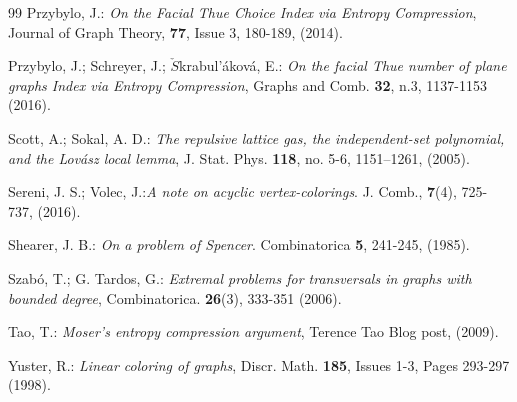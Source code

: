 \documentclass[11pt]{article}
\begin{document}
\begin{thebibliography}{99}
 Przybylo, J.: {\it On the Facial Thue Choice Index via Entropy Compression},
Journal of Graph Theory, {\bf 77}, Issue 3, 180-189, (2014).

 Przybylo, J.; Schreyer, J.; $\check{S}$krabul'\'akov\'a, E.: {\it On the facial Thue number
of plane graphs Index via Entropy Compression}, Graphs and Comb. {\bf 32}, n.3, 1137-1153 (2016).



  Scott, A.; Sokal, A. D.: {\it The repulsive lattice gas,
the independent-set polynomial, and the Lov\'asz local lemma},
 J. Stat. Phys.  {\bf 118}, no. 5-6, 1151--1261, (2005).

  Sereni, J. S.; Volec, J.:{\it  A note on acyclic vertex-colorings}. J. Comb., {\bf 7}(4), 725-737, (2016).

  Shearer, J. B.: {\it On a problem of Spencer}. Combinatorica {\bf 5}, 241-245, (1985).

  Szab\'o, T.; G. Tardos, G.: {\it Extremal problems for transversals in graphs with bounded degree},
Combinatorica. {\bf 26}(3),  333-351 (2006).

 Tao, T.: {\it Moser's entropy compression argument},  Terence Tao Blog post, (2009).

 Yuster, R.: {\it Linear coloring of graphs}, Discr. Math. {\bf 185}, Issues 1-3, Pages 293-297 (1998).





\end{thebibliography}
\end{document}
